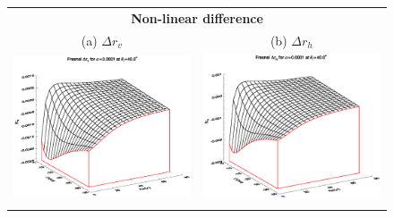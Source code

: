 \begin{figure}[htp]
  \centering
  \begin{tabular}{c c}
    \multicolumn{2}{c}{\sffamily\textbf{Non-linear difference}}\\
    \textsf{(a)} $\Delta r_v$ &
    \textsf{(b)} $\Delta r_h$ \\
    \includegraphics[bb=115 240 508 540,clip,scale=0.5]{graphics/Fresnel/FWDTL/FWDdrv_a0.0001_z40.0.eps} &
    \includegraphics[bb=120 240 508 540,clip,scale=0.5]{graphics/Fresnel/FWDTL/FWDdrh_a0.0001_z40.0.eps} \\\\

\end{tabular}
\end{figure}
